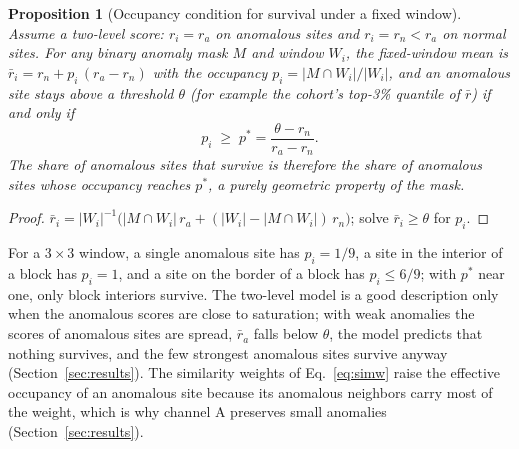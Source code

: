 \documentclass[preprint,review,12pt]{elsarticle}
\newtheorem{proposition}{Proposition}
\begin{document}
\begin{proposition}[Occupancy condition for survival under a fixed window]
\label{prop:surv}
Assume a two-level score: $r_i=r_a$ on anomalous sites and $r_i=r_n<r_a$ on normal sites. For any binary anomaly mask $M$ and window $W_i$, the fixed-window mean is $\bar r_i=r_n+p_i\,(r_a-r_n)$ with the occupancy $p_i=|M\cap W_i|/|W_i|$, and an anomalous site stays above a threshold $\theta$ (for example the cohort's top-3\% quantile of $\bar r$) if and only if
\begin{equation}
p_i\;\ge\;p^{*}=\frac{\theta-r_n}{r_a-r_n}.
\label{eq:pstar}
\end{equation}
The share of anomalous sites that survive is therefore the share of anomalous sites whose occupancy reaches $p^{*}$, a purely geometric property of the mask.
\end{proposition}
\begin{proof}
$\bar r_i=|W_i|^{-1}\bigl(|M\cap W_i|\,r_a+(|W_i|-|M\cap W_i|)\,r_n\bigr)$; solve $\bar r_i\ge\theta$ for $p_i$.
\end{proof}
For a $3\times3$ window, a single anomalous site has $p_i=1/9$, a site in the interior of a block has $p_i=1$, and a site on the border of a block has $p_i\le 6/9$; with $p^{*}$ near one, only block interiors survive. The two-level model is a good description only when the anomalous scores are close to saturation; with weak anomalies the scores of anomalous sites are spread, $\bar r_a$ falls below $\theta$, the model predicts that nothing survives, and the few strongest anomalous sites survive anyway (Section~\ref{sec:results}). The similarity weights of Eq.~\eqref{eq:simw} raise the effective occupancy of an anomalous site because its anomalous neighbors carry most of the weight, which is why channel A preserves small anomalies (Section~\ref{sec:results}).
\end{document}
